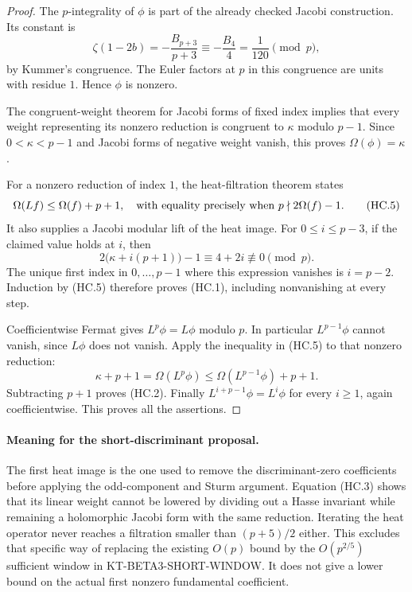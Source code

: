 \begin{proof}
The $p$-integrality of $\phi$ is part of the already checked
Jacobi construction.  Its constant is
\[
 \zeta(1-2b)=-\frac{B_{p+3}}{p+3}
             \equiv-\frac{B_4}{4}=\frac1{120}\pmod p,
 \tag{HC.4}
\]
by Kummer's congruence.  The Euler factors at $p$ in this
congruence are units with residue $1$.  Hence $\phi$ is nonzero.

The congruent-weight theorem for Jacobi forms of fixed index
implies that every weight representing its nonzero reduction
is congruent to $\kappa$ modulo $p-1$.  Since
$0<\kappa<p-1$ and Jacobi forms of negative weight vanish,
this proves $\Omega(\phi)=\kappa$.

For a nonzero reduction of index $1$, the heat-filtration
theorem states
\[
 \Omega(Lf)\leq\Omega(f)+p+1,
 \quad\hbox{with equality precisely when }
 p\nmid 2\Omega(f)-1.
 \tag{HC.5}
\]
It also supplies a Jacobi modular lift of the heat image.
For $0\leq i\leq p-3$, if the claimed value holds at $i$, then
\[
 2\bigl(\kappa+i(p+1)\bigr)-1
       \equiv4+2i\not\equiv0\pmod p.
 \tag{HC.6}
\]
The unique first index in $0,\ldots,p-1$ where this expression
vanishes is $i=p-2$.  Induction by (HC.5) therefore proves
(HC.1), including nonvanishing at every step.

Coefficientwise Fermat gives $L^p\phi=L\phi$ modulo $p$.
In particular $L^{p-1}\phi$ cannot vanish, since $L\phi$
does not vanish.  Apply the inequality in (HC.5) to that
nonzero reduction:
\[
 \kappa+p+1=\Omega(L^p\phi)
       \leq\Omega(L^{p-1}\phi)+p+1.
 \]
Subtracting $p+1$ proves (HC.2).
Finally $L^{i+p-1}\phi=L^i\phi$ for every $i\geq1$, again
coefficientwise.  This proves all the assertions.
\end{proof}

\paragraph{Meaning for the short-discriminant proposal.}
The first heat image is the one used to remove the
discriminant-zero coefficients before applying the odd-component
and Sturm argument.  Equation (HC.3) shows that its linear
weight cannot be lowered by dividing out a Hasse invariant
while remaining a holomorphic Jacobi form with the same
reduction.  Iterating the heat operator never reaches a
filtration smaller than $(p+5)/2$ either.  This excludes that
specific way of replacing the existing $O(p)$ bound by the
$O(p^{2/5})$ sufficient window in KT-BETA3-SHORT-WINDOW.
It does not give a lower bound on the actual first nonzero
fundamental coefficient.

